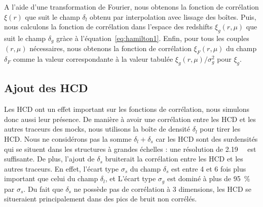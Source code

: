 \documentclass[11pt, twoside, a4paper, openright]{report}
\begin{document}
A l'aide d'une transformation de Fourier, nous obtenons la fonction de corrélation $\xi(r)$ que suit le champ $\delta_l$ obtenu par interpolation avec lissage des boîtes.
Puis, nous calculons la fonction de corrélation dans l'espace des redshifts $\xi_g(r, \mu)$ que suit le champ $\delta_g$ gràce à l'équation~\ref{eq:hamilton1}. Enfin, pour tous les couples $(r,\mu)$ nécessaires, nous obtenons la fonction de corrélation $\xi_F(r, \mu)$ du champ $\delta_F$ comme la valeur correspondante à la valeur tabulée $\xi_g(r, \mu) / \sigma_g^2$ pour $\xi_g$.


\subsection{Ajout des HCD}
\label{subsec:hcd}
Les HCD ont un effet important sur les fonctions de corrélation, nous simulons donc aussi leur présence. De manière à avoir une corrélation entre les HCD et les autres traceurs des mocks, nous utilisons la boîte de densité $\delta_l$ pour tirer les HCD. Nous ne considérons pas la somme $\delta_l + \delta_s$ car les HCD sont des surdensités qui se situent dans les structures à grandes échelles : une résolution de \SI{2.19}{\perh\Mpc} est suffisante. De plus, l'ajout de $\delta_s$ bruiterait la corrélation entre les HCD et les autres traceurs. En effet, l'écart type $\sigma_s$ du champ $\delta_s$ est entre 4 et 6 fois plus important que celui du champ $\delta_l$, et L'écart type $\sigma_g$ est dominé à plus de \SI{95}{\percent} par $\sigma_s$. Du fait que $\delta_s$ ne possède pas de corrélation à 3 dimensions, les HCD se situeraient principalement dans des pics de bruit non corrélés.
\end{document}
